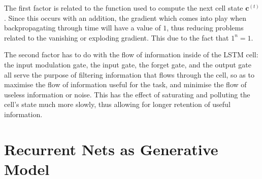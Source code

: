 \documentclass{article}
\begin{document}
\begin{enumerate}[label=\textbf{1.\arabic*}]
  The first factor is related to the function used to compute the next cell state $\mathbf{c}^{(t)}$. Since this occurs with an addition, the gradient which comes into play when backpropagating through time will have a value of $1$, thus reducing problems related to the vanishing or exploding gradient. This due to the fact that $1^n = 1$.

  The second factor has to do with the flow of information inside of the LSTM cell: the input modulation gate, the input gate, the forget gate, and the output gate all serve the purpose of filtering information that flows through the cell, so as to maximise the flow of information useful for the task, and minimise the flow of useless information or noise. This has the effect of saturating and polluting the cell's state much more slowly, thus allowing for longer retention of useful information.
\end{enumerate}

\section{Recurrent Nets as Generative Model}
\end{document}
